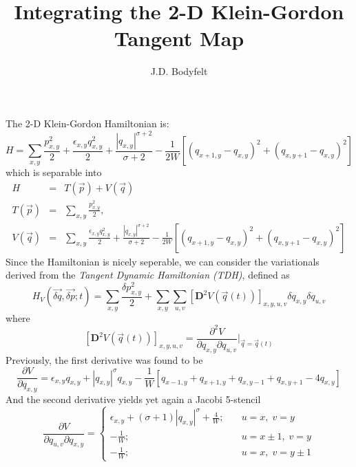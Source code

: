 \documentclass[12pt, a4paper, prl]{revtex4}
\newcommand{\abs}[1]{\left| #1 \right|}
\begin{document}
\lstset{language=[95]Fortran}
\title{Integrating the 2-D Klein-Gordon Tangent Map}
\author{J.D. Bodyfelt}
\maketitle

The 2-D Klein-Gordon Hamiltonian is:
\begin{equation}
 H = \sum_{x,y} \frac{p_{x,y}^2}{2} + \frac{\epsilon_{x,y} q_{x,y}^2}{2} + \frac{\abs{q_{x,y}}^{\sigma + 2}}{\sigma + 2} - \frac{1}{2W}\left[
 \left(q_{x+1,y} - q_{x,y} \right)^2 + \left(q_{x,y+1} - q_{x,y} \right)^2 \right]
\end{equation}
which is separable into
\begin{eqnarray*}
 H &=& T(\vec p) + V(\vec q) \\
T(\vec p) &=& \sum_{x,y} \frac{p_{x,y}^2}{2}, \\
V(\vec q) &=& \sum_{x,y} \frac{\epsilon_{x,y} q_{x,y}^2}{2} + \frac{\abs{q_{x,y}}^{\sigma + 2}}{\sigma + 2} - \frac{1}{2W}\left[
 \left(q_{x+1,y} - q_{x,y} \right)^2 + \left(q_{x,y+1} - q_{x,y} \right)^2 \right]
\end{eqnarray*}
Since the Hamiltonian is nicely seperable, we can consider the variationals derived from the 
\textit{Tangent Dynamic Hamiltonian (TDH)}, defined as
\begin{equation}
H_V(\vec{\delta q}, \vec{\delta p}; t) = \sum_{x,y} \frac{\delta p_{x,y}^2}{2} + \sum_{x,y} \sum_{u,v} \left[\mathbf{D}^2V(\vec{q}(t))\right]_{x,y,u,v} \delta q_{x,y} \delta q_{u,v}
\end{equation}
where
\begin{equation*}
 \left[\mathbf{D}^2V(\vec{q}(t))\right]_{x,y,u,v} = \frac{\partial^2 V}{\partial q_{x,y} \partial q_{u,v}} \Bigg\vert_{{\vec q} = {\vec q}(t)}
\end{equation*}
Previously, the first derivative was found to be
\begin{equation*}
\frac{\partial V}{\partial q_{x,y}} = \epsilon_{x,y} q_{x,y} + \abs{q_{x,y}}^\sigma q_{x,y}  - \frac{1}{W}\left[ q_{x-1,y} + q_{x+1,y} + q_{x,y-1} + q_{x,y+1} - 4 q_{x,y} \right]
\end{equation*}
And the second derivative yields yet again a Jacobi 5-stencil
\begin{equation*}
\frac{\partial V}{\partial q_{u,v} \partial q_{x,y}} = \begin{cases}
                                                        \epsilon_{x,y} + \left(\sigma + 1\right)\abs{q_{x,y}}^\sigma + \frac{4}{W}; &\quad u=x,\; v=y \\
                                                        -\frac{1}{W}; &\quad u=x\pm1,\; v=y \\
                                                        -\frac{1}{W}; &\quad u=x,\; v=y\pm1
                                                       \end{cases}
\end{equation*}
\end{document}
